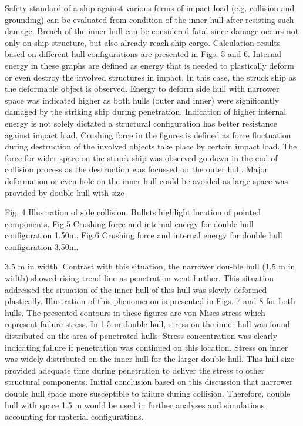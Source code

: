 \documentclass[10pt,journal]{IEEEtran}
\begin{document}
Safety standard of a ship against various forms of impact load (e.g. collision and grounding) can be evaluated from condition of the inner hull after resisting such damage. 
Breach of the inner hull can be considered fatal since damage occurs not only on ship structure, but also already reach ship cargo. Calculation results based on different hull configurations are presented in Figs. 5 and 6. 
Internal energy in these graphs are defined as energy that is needed to plastically deform or even destroy the involved structures in impact. 
In this case, the struck ship as the deformable object is observed. Energy to deform side hull with narrower space was indicated higher as both hulls (outer and inner) were significantly damaged by the striking ship during penetration. 
Indication of higher internal energy is not solely dictated a structural configuration has better resistance against impact load. 
Crushing force in the figures is defined as force fluctuation during destruction of the involved objects take place by certain impact load. 
The force for wider space on the struck ship was observed go down in the end of collision process as the destruction was focussed on the outer hull. Major deformation or even hole on the inner hull could be 
avoided as large space was provided by double hull with size

Fig. 4 Illustration of side collision. Bullets highlight location of pointed components. 
Fig.5 Crushing force and internal energy for double hull configuration 1.50m.
Fig.6 Crushing force and internal energy for double hull configuration 3.50m.
 
3.5 m in width. Contrast with this situation, the narrower dou-ble hull (1.5 m in width) showed rising trend line as penetration went further. 
This situation addressed the situation of the inner hull of this hull was slowly deformed plastically. Illustration of this phenomenon is presented in Figs. 7 and 8 for both hulls. 
The presented contours in these figures are von Mises stress which represent failure stress. In 1.5 m double hull, stress on the inner hull was found distributed on the area of penetrated hulls. 
Stress concentration was clearly indicating failure if pen­etration was continued on this location. 
Stress on inner was widely distributed on the inner hull for the larger double hull. This hull size provided adequate time during penetration to deliver the stress to other structural components. 
Initial conclusion based on this discussion that narrower double hull space more susceptible to failure during collision. 
Therefore, double hull with space 1.5 m would be used in further analyses and simulations accounting for material configurations. 
\end{document}
